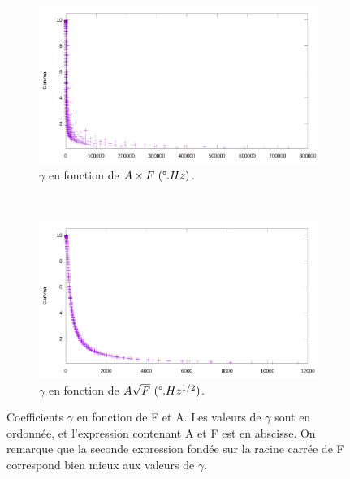 	\clearpage %
	\begin{figure}[!htb]
		\centering
		\begin{subfigure}[t]{\textwidth}
			\centering
			\includegraphics[width=\textwidth]{figures/ch4/afVgamma}
			\caption{$\gamma$ en fonction de $A\times{}F~(\degree{}.Hz)$.}
			\label{fig:gammaAF}
		\end{subfigure}
		~
		\begin{subfigure}[t]{\textwidth}
			\centering
			\includegraphics[width=\textwidth]{figures/ch4/asqrtFVgamma}
			\caption{$\gamma$ en fonction de $A\sqrt{F}~ (\degree{}.Hz^{1/2})$.}
			\label{fig:gammaASQRTF}
		\end{subfigure}
		\caption[Coefficients $\gamma$ en fonction de F et A, bis]{Coefficients $\gamma$ en fonction de F et A. Les valeurs de $\gamma$ sont en ordonnée, et l'expression contenant A et F est en abscisse. On remarque que la seconde expression fondée sur la racine carrée de F correspond bien mieux aux valeurs de $\gamma$.}
		\label{fig:gammaVentropy}
	\end{figure}


